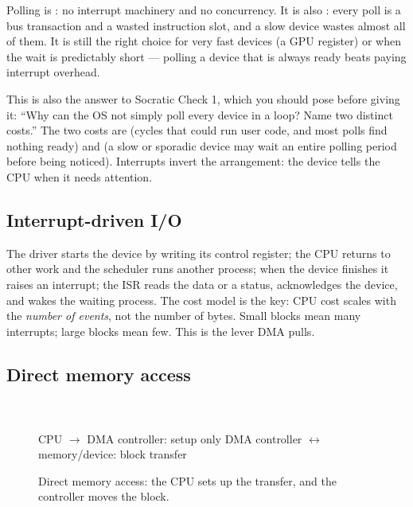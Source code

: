 \documentclass[11pt]{article}
\begin{document}
Polling is : no interrupt machinery and no concurrency. It is also
: every poll is a bus transaction and a wasted instruction slot,
and a slow device wastes almost all of them. It is still the right choice for
very fast devices (a GPU register) or when the wait is predictably short ---
polling a device that is always ready beats paying interrupt overhead.

This is also the answer to Socratic Check 1, which you should pose before giving
it: ``Why can the OS not simply poll every device in a loop? Name two distinct
costs.'' The two costs are  (cycles that could run user code, and
most polls find nothing ready) and  (a slow or sporadic device
may wait an entire polling period before being noticed). Interrupts invert the
arrangement: the device tells the CPU when it needs attention.

\subsection*{Interrupt-driven I/O}

The driver starts the device by writing its control register; the CPU returns to
other work and the scheduler runs another process; when the device finishes it
raises an interrupt; the ISR reads the data or a status, acknowledges the device,
and wakes the waiting process. The cost model is the key: CPU cost scales with
the \emph{number of events}, not the number of bytes. Small blocks mean many
interrupts; large blocks mean few. This is the lever DMA pulls.

\subsection*{Direct memory access}

\begin{figure}[ht]
\centering
\small
{}\hfill
{}\hfill
{}\\[0.3em]
\\[0.3em]
{\footnotesize CPU $\to$ DMA controller: setup only \quad
DMA controller $\leftrightarrow$ memory/device: block transfer}
\caption{Direct memory access: the CPU sets up the transfer, and the controller
moves the block.}
\label{fig:dma}
\end{figure}
\end{document}
